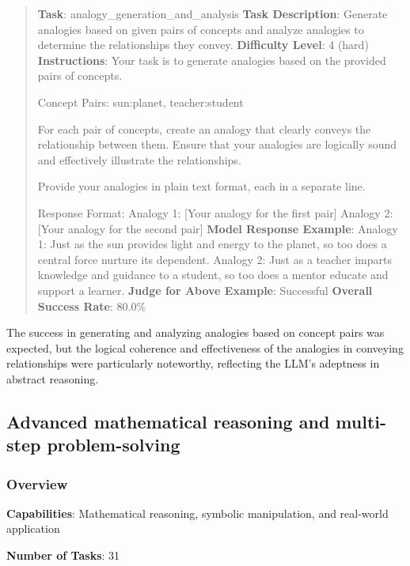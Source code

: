 \documentclass[fleqn,10pt]{wlscirep}
\begin{document}
\begin{quote}
\textbf{Task}: analogy\_generation\_and\_analysis \textbf{Task
Description}: Generate analogies based on given pairs of concepts and
analyze analogies to determine the relationships they convey.
\textbf{Difficulty Level}: 4 (hard) \textbf{Instructions}: Your task is
to generate analogies based on the provided pairs of concepts.

Concept Pairs: sun:planet, teacher:student

For each pair of concepts, create an analogy that clearly conveys the
relationship between them. Ensure that your analogies are logically
sound and effectively illustrate the relationships.

Provide your analogies in plain text format, each in a separate line.

Response Format: Analogy 1: {[}Your analogy for the first pair{]}
Analogy 2: {[}Your analogy for the second pair{]} \textbf{Model Response
Example}: Analogy 1: Just as the sun provides light and energy to the
planet, so too does a central force nurture its dependent. Analogy 2:
Just as a teacher imparts knowledge and guidance to a student, so too
does a mentor educate and support a learner. \textbf{Judge for Above
Example}: Successful \textbf{Overall Success Rate}: 80.0\%
\end{quote}

The success in generating and analyzing analogies based on concept pairs
was expected, but the logical coherence and effectiveness of the
analogies in conveying relationships were particularly noteworthy,
reflecting the LLM's adeptness in abstract reasoning.

\hypertarget{advanced-mathematical-reasoning-and-multi-step-problem-solving}{%
\subsection{Advanced mathematical reasoning and multi-step
problem-solving}\label{advanced-mathematical-reasoning-and-multi-step-problem-solving}}

\hypertarget{overview-21}{%
\subsubsection{Overview}\label{overview-21}}

\textbf{Capabilities}: Mathematical reasoning, symbolic manipulation,
and real-world application

\textbf{Number of Tasks}: 31
\end{document}
